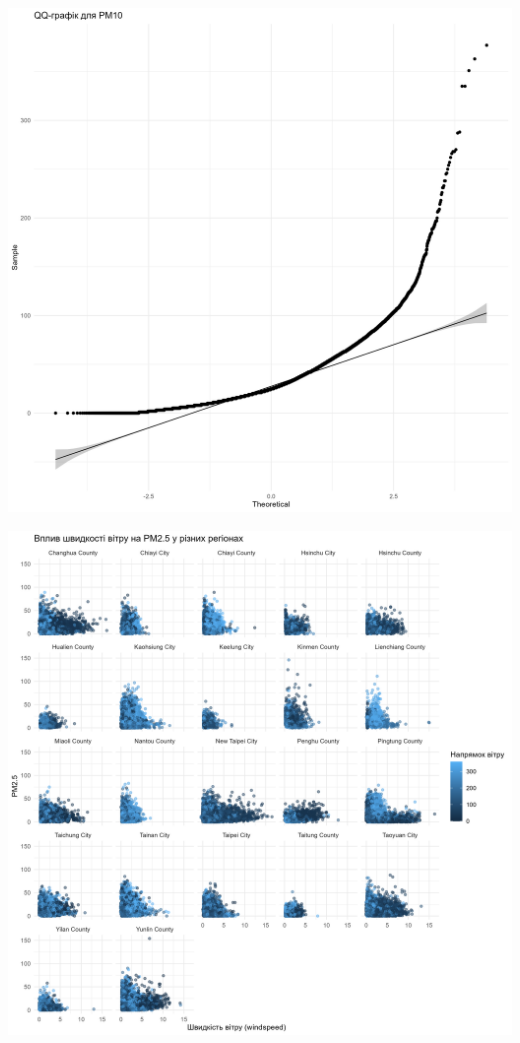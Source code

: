 \documentclass[./report.tex]{subfiles}
\begin{document}
\begin{enumerate}
    \includegraphics[width=6in]{plots/question1/qq_pm10.png}

    \includegraphics[width = 6in]{plots/question1/scatter_pm2_5_region.png}


\end{enumerate}
\end{document}
